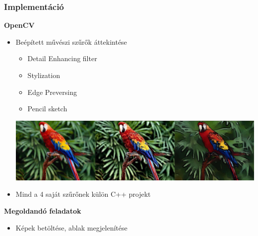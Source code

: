 \documentclass{beamer}
\begin{document}
\begin{frame}[fragile]
\frametitle{Implementáció}

\textbf{OpenCV}

\begin{itemize}
\item Beépített művészi szűrők áttekintése
\begin{itemize}
\item Detail Enhancing filter
\item Stylization
\item Edge Preversing
\item Pencil sketch
\end{itemize}
\begin{center}
\includegraphics[scale=0.23]{kepek/beepitett_szurok/beepitett_szurok.jpg}
\end{center}
\item Mind a 4 saját szűrőnek külön C++ projekt
\end{itemize}

\medskip

\textbf{Megoldandó feladatok}
\begin{itemize}
\item Képek betöltése, ablak megjelenítése
\end{itemize}

\end{frame}
\end{document}
